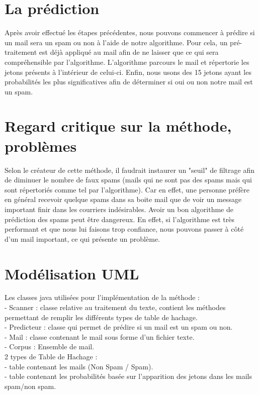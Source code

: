 \documentclass{article}
\begin{document}
\section{La prédiction}

Après avoir effectué les étapes précédentes, nous pouvons commencer à prédire si un mail sera un spam ou non à l'aide de notre algorithme. Pour cela, un pré-traitement est déjà appliqué au mail afin de ne laisser que ce qui sera compréhensible par l'algorithme. L'algorithme parcours le mail et répertorie les jetons présents à l'intérieur de celui-ci. Enfin, nous usons des 15 jetons ayant les probabilités les plus significatives afin de déterminer si oui ou non notre mail est un spam. 

\section{Regard critique sur la méthode, problèmes}

Selon le créateur de cette méthode, il faudrait instaurer un 
"seuil" de filtrage afin de diminuer le nombre de faux spams (mails qui ne sont pas des spams mais qui sont répertoriés comme tel par l'algorithme). Car en effet, une personne préfère en général recevoir quelque spams dans sa boite mail que de voir un message important finir dans les courriers indésirables. 
Avoir un bon algorithme de prédiction des spams peut être dangereux. En effet, si l'algorithme est très performant et que nous lui faisons trop confiance, nous pouvons passer à côté d'un mail important, ce qui présente un problème.

\section{Modélisation UML}

Les classes java utilisées pour l'implémentation de la méthode : \\
- Scanner : classe relative au traitement du texte, contient les méthodes permettant de remplir les différents types de table de hachage. \\
- Predicteur : classe qui permet de prédire si un mail est un spam ou non. \\
- Mail : classe contenant le mail sous forme d'un fichier texte.\\
- Corpus : Ensemble de mail. \\

2 types de Table de Hachage  :\\
- table contenant les mails (Non Spam / Spam).\\
- table contenant les probabilités basée sur l'apparition des jetons dans les mails spam/non spam.\\
\end{document}
